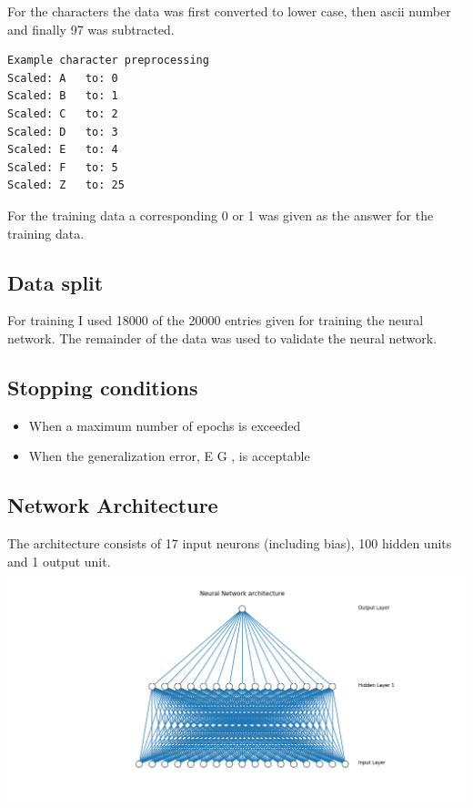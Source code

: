 \documentclass[11pt]{article}
\makeatletter
\def\maxwidth{\ifdim\Gin@nat@width>\linewidth\linewidth
    \else\Gin@nat@width\fi}
\let\Oldincludegraphics\includegraphics
\renewcommand{\includegraphics}[1]{\Oldincludegraphics[width=.8\maxwidth]{#1}}
\providecommand{\tightlist}{%
      \setlength{\itemsep}{0pt}\setlength{\parskip}{0pt}}
\makeatother
\begin{document}
For the characters the data was first converted to lower case, then
ascii number and finally 97 was subtracted.

\begin{verbatim}
Example character preprocessing
Scaled: A   to: 0
Scaled: B   to: 1
Scaled: C   to: 2
Scaled: D   to: 3
Scaled: E   to: 4
Scaled: F   to: 5
Scaled: Z   to: 25
\end{verbatim}

For the training data a corresponding 0 or 1 was given as the answer for
the training data.

    \hypertarget{data-split}{%
\subsection{Data split}\label{data-split}}

For training I used 18000 of the 20000 entries given for training the
neural network. The remainder of the data was used to validate the
neural network.

\hypertarget{stopping-conditions}{%
\subsection{Stopping conditions}\label{stopping-conditions}}

\begin{itemize}
\tightlist
\item
  When a maximum number of epochs is exceeded
\item
  When the generalization error, E G , is acceptable
\end{itemize}

\hypertarget{network-architecture}{%
\subsection{Network Architecture}\label{network-architecture}}

The architecture consists of 17 input neurons (including bias), 100
hidden units and 1 output unit. \includegraphics{Experiment2NN.png}
\end{document}
